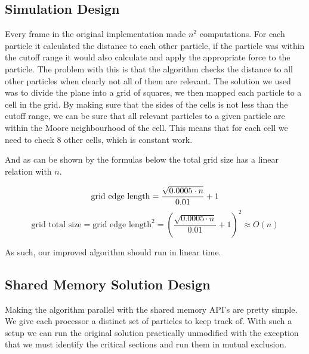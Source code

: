 
    \subsection{Simulation Design}

        Every frame in the original implementation made $n^2$ computations. For
        each particle it calculated the distance to each other particle, if the
        particle was within the cutoff range it would also calculate and apply
        the appropriate force to the particle. The problem with this is that the
        algorithm checks the distance to all other particles when clearly not
        all of them are relevant. The solution we used was to divide the plane
        into a grid of squares, we then mapped each particle to a cell in the
        grid. By making sure that the sides of the cells is not less than the
        cutoff range, we can be sure that all relevant particles to a given
        particle are within the Moore neighbourhood of the cell. This means that
        for each cell we need to check 8 other cells, which is constant work.

        And as can be shown by the formulas below the total grid size has a
        linear relation with $n$.

        \begin{equation*}
            \text{grid edge length} = \frac{\sqrt{0.0005 \cdot n}}{0.01} + 1 \\
        \end{equation*}
        \begin{equation*}
            \text{grid total size} = \text{grid edge length}^2 = \left(\frac{\sqrt{0.0005 \cdot n}}{0.01} + 1\right)^2 \approx O(n)
        \end{equation*}

        As such, our improved algorithm should run in linear time.

    \subsection{Shared Memory Solution Design}

    Making the algorithm parallel with the shared memory API's are pretty
    simple. We give each processor a distinct set of particles to keep track
    of. With such a setup we can run the original solution practically
    unmodified with the exception that we must identify the critical sections
    and run them in mutual exclusion.

